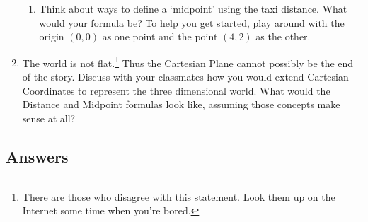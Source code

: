 \begin{enumerate}
\begin{enumerate}
\item Think about ways to define a `midpoint' using the taxi distance.  What would your formula be?  To help you get started, play around with the origin $(0,0)$ as one point and the point $(4,2)$ as the other.

\end{enumerate}


\item \label{orderedtripleexercise} The world is not flat.\footnote{There are those who disagree with this statement.  Look them up on the Internet some time when you're bored.}  Thus the Cartesian Plane cannot possibly be the end of the story.  Discuss with your classmates how you would extend Cartesian Coordinates to represent the three dimensional world.  What would the Distance and Midpoint formulas look like, assuming those concepts make sense at all?

\end{enumerate}


\newpage

\subsection{Answers}

